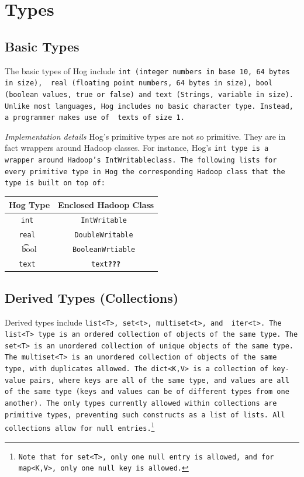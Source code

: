 \documentclass{article}
\begin{document}

\section{Types} %
\label{sec:types}

\subsection{Basic Types} %
\label{sub:basic_types}

The basic types of Hog include \tt int \rm (integer numbers in base 10, 64 bytes in size), \tt
real \rm (floating point numbers, 64 bytes in size), \tt bool \rm(boolean values,
true or false) and \tt text \rm (Strings, variable in size). Unlike most languages,
Hog includes no basic character type. Instead, a programmer makes use of \tt
text\rm s of size 1.

\emph{Implementation details} Hog’s primitive types are not so primitive. They are
in fact wrappers around Hadoop classes. For instance, Hog’s \tt int \rm type is a
wrapper around Hadoop's \tt IntWritableclass\rm. The following lists for every
primitive type in Hog the corresponding Hadoop class that the type is built on top
of:

\begin{center}
\begin{tabular}{|c|c|}
    \hline
\textbf{Hog Type} & \textbf{Enclosed Hadoop Class} \\ \hline
\tt int & \tt IntWritable \\ \hline
\tt real & \tt DoubleWritable \\ \hline
\t bool & \tt BooleanWrtiable \\ \hline
\tt text & \tt text\textbf{???}\rm \\ \hline
\end{tabular}
\end{center}


\subsection{Derived Types (Collections)} %
\label{sub:derived_types_collections_}

Derived types include \tt list<T>\rm, \tt set<t>\rm, \tt multiset<t>\rm, and \tt
iter<t>\rm. The \tt list<T> \rm type is an ordered collection of objects of the
same type. The \tt set<T> \rm is an unordered collection of unique objects of the
same type. The \tt multiset<T> \rm is an unordered collection of objects of the
same type, with duplicates allowed. The \tt dict<K,V> \rm is a collection of
key­value pairs, where keys are all of the same type, and values are all of the
same type (keys and values can be of different types from one another). The only
types currently allowed within collections are primitive types, preventing such
constructs as a list of lists. All collections allow for null
entries.\footnote{Note that for \tt set<T>\rm, only one \tt null \rm entry is
allowed, and for \tt map<K,V>\rm, only one \tt null \rm key is allowed.}
\end{document}
